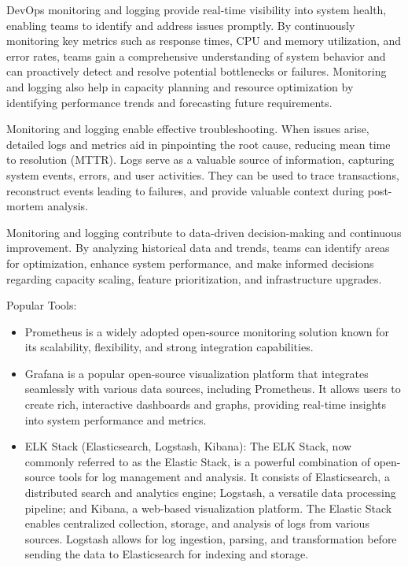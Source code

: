 \documentclass[12pt]{book}
\begin{document}
DevOps monitoring and logging provide real-time visibility into system health, enabling teams to identify and address issues promptly. 
By continuously monitoring key metrics such as response times, CPU and memory utilization, and error rates, teams gain a comprehensive understanding of system behavior and can proactively detect and resolve potential bottlenecks or failures. 
Monitoring and logging also help in capacity planning and resource optimization by identifying performance trends and forecasting future requirements.

Monitoring and logging enable effective troubleshooting. When issues arise, detailed logs and metrics aid in pinpointing the root cause, reducing mean time to resolution (MTTR). 
Logs serve as a valuable source of information, capturing system events, errors, and user activities. They can be used to trace transactions, reconstruct events leading to failures, and provide valuable context during post-mortem analysis.

Monitoring and logging contribute to data-driven decision-making and continuous improvement. 
By analyzing historical data and trends, teams can identify areas for optimization, enhance system performance, and make informed decisions regarding capacity scaling, feature prioritization, and infrastructure upgrades.

Popular Tools:
\begin{itemize}
    \item Prometheus is a widely adopted open-source monitoring solution known for its scalability, flexibility, and strong integration capabilities.
    \item Grafana is a popular open-source visualization platform that integrates seamlessly with various data sources, including Prometheus. It allows users to create rich, interactive dashboards and graphs, providing real-time insights into system performance and metrics.
    \item ELK Stack (Elasticsearch, Logstash, Kibana): The ELK Stack, now commonly referred to as the Elastic Stack, is a powerful combination of open-source tools for log management and analysis. It consists of Elasticsearch, a distributed search and analytics engine; Logstash, a versatile data processing pipeline; and Kibana, a web-based visualization platform. The Elastic Stack enables centralized collection, storage, and analysis of logs from various sources. Logstash allows for log ingestion, parsing, and transformation before sending the data to Elasticsearch for indexing and storage.
\end{itemize}
\end{document}
